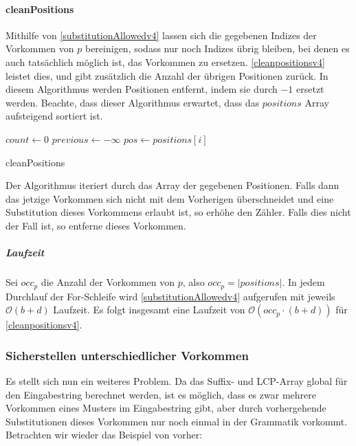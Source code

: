 \paragraph{cleanPositions}
\label{parcleanpositions}

Mithilfe von \autoref{substitutionAllowedv4} lassen sich die gegebenen Indizes der Vorkommen von $p$ bereinigen, sodass nur noch Indizes übrig bleiben, bei denen es auch tatsächlich möglich ist, das Vorkommen zu ersetzen. \autoref{cleanpositionsv4} leistet dies, und gibt zusätzlich die Anzahl der übrigen Positionen zurück. In diesem Algorithmus werden Positionen entfernt, indem sie durch $-1$ ersetzt werden. Beachte, dass dieser Algorithmus erwartet, dass das $positions$ Array aufsteigend sortiert ist.

\begin{algorithm}[t]
    $count \leftarrow 0$\;
    $previous \leftarrow -\infty$\;
     {
        $pos \leftarrow positions[i]$\;
    }
    \caption{cleanPositions}
    \label{cleanpositionsv4}
\end{algorithm}

Der Algorithmus iteriert durch das Array der gegebenen Positionen. Falls dann das jetzige Vorkommen sich nicht mit dem Vorherigen überschneidet und eine Substitution dieses Vorkommens erlaubt ist, so erhöhe den Zähler. Falls dies nicht der Fall ist, so entferne dieses Vorkommen.

\subparagraph{Laufzeit}
Sei $occ_p$ die Anzahl der Vorkommen von $p$, also $occ_p = |positions|$. In jedem Durchlauf der For-Schleife wird \autoref{substitutionAllowedv4} aufgerufen mit jeweils $\mathcal{O}(b + d)$ Laufzeit. Es folgt insgesamt eine Laufzeit von $\mathcal{O}(occ_p \cdot (b + d))$ für \autoref{cleanpositionsv4}.

\subsubsection{Sicherstellen unterschiedlicher Vorkommen}
\label{differingV4}

Es stellt sich nun ein weiteres Problem. Da das Suffix- und LCP-Array global für den Eingabestring berechnet werden, ist es möglich, dass es zwar mehrere Vorkommen eines Musters im Eingabestring gibt, aber durch vorhergehende Substitutionen dieses Vorkommen nur noch einmal in der Grammatik vorkommt. Betrachten wir wieder das Beispiel von vorher:

